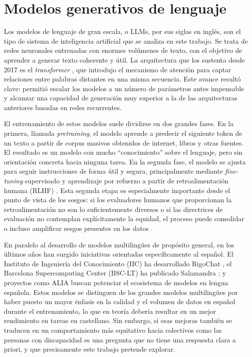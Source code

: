 \documentclass[12pt]{report} %
\renewcommand{\_}{\oldunderscore\allowbreak}
\begin{document}
\section{Modelos generativos de lenguaje}
Los modelos de lenguaje de gran escala, o LLMs, por sus siglas en inglés, son el tipo de sistema de inteligencia artificial que se analiza en este trabajo. Se trata de redes neuronales entrenadas con enormes volúmenes de texto, con el objetivo de aprender a generar texto coherente y útil. La arquitectura que los sustenta desde 2017 es el \textit{transformer} \cite{vaswani2017attention}, que introdujo el mecanismo de atención para captar relaciones entre palabras distantes en una misma secuencia. Este avance resultó clave: permitió escalar los modelos a un número de parámetros antes impensable y alcanzar una capacidad de generación muy superior a la de las arquitecturas anteriores basadas en redes recurrentes.

El entrenamiento de estos modelos suele dividirse en dos grandes fases. En la primera, llamada \textit{pretraining}, el modelo aprende a predecir el siguiente token de un texto a partir de corpus masivos obtenidos de internet, libros y otras fuentes. El resultado es un modelo con mucho ``conocimiento'' sobre el lenguaje, pero sin orientación concreta hacia ninguna tarea. En la segunda fase, el modelo se ajusta para seguir instrucciones de forma útil y segura, principalmente mediante \textit{fine-tuning} supervisado y aprendizaje por refuerzo a partir de retroalimentación humana (RLHF) \cite{ouyang2022instructgpt}. Esta segunda etapa es especialmente importante desde el punto de vista de los sesgos: si los evaluadores humanos que proporcionan la retroalimentación no son lo suficientemente diversos o si las directrices de evaluación no contemplan explícitamente la equidad, el proceso puede consolidar o incluso amplificar sesgos presentes en los datos \cite{guo2024bias}.

En paralelo al desarrollo de modelos multilingües de propósito general, en los últimos años han surgido iniciativas orientadas específicamente al español. El Instituto de Ingeniería del Conocimiento (IIC) ha desarrollado RigoChat \cite{rigochat}, el Barcelona Supercomputing Center (BSC-LT) ha publicado Salamandra \cite{salamandra}; y proyectos como ALIA \cite{alia2025} buscan potenciar el ecosistema de modelos en lengua española. Estos modelos se distinguen de los grandes modelos multilingües por haber puesto un mayor énfasis en la calidad y el volumen de datos en español durante el entrenamiento, lo que en teoría debería resultar en un mejor rendimiento en tareas en castellano. Sin embargo, si esas mejoras también se traducen en un comportamiento más equitativo hacia colectivos como las personas con discapacidad es una pregunta que no tiene una respuesta clara a priori, y que precisamente este trabajo pretende explorar.
\end{document}

